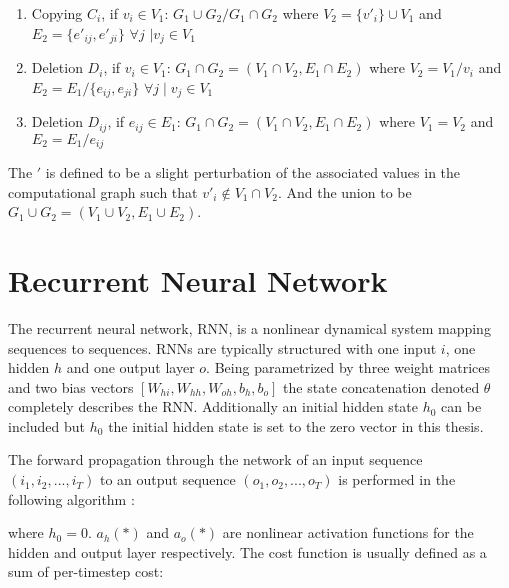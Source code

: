 \begin{enumerate}
    \item Copying $C_i$, if $v_i \in V_1$: $G_1 \cup G_2 / G_1 \cap G_2$ where $V_2 = \{v'_i\} \cup V_1$ and $E_2 = \{e'_{ij}, e'_{ji}\}$ $\forall j$ $\mid v_j \in V_1$
    \item Deletion $D_i $, if $v_i \in V_1$: $G_1 \cap G_2 = (V_1 \cap V_2, E_1 \cap E_2)$ where $V_2 = V_1 / v_i$ and $E_2 = E_1 / \{e_{ij}, e_{ji}\} $ $ \forall j \mid v_j \in V_1 $
    \item Deletion $D_{ij}$, if $e_{ij} \in E_1$: $G_1 \cap G_2 = (V_1 \cap V_2, E_1 \cap E_2)$ where $V_1 = V_2$ and $E_2 = E_1 / e_{ij}$
\end{enumerate}

The $'$ is defined to be a slight perturbation of the associated values in the computational graph such that $v'_i \notin V_1 \cap V_2$. And the union to be $G_1 \cup G_2 = (V_1 \cup V_2, E_1 \cup E_2)$.

\section{Recurrent Neural Network}

The recurrent neural network, RNN, is a nonlinear dynamical system mapping sequences to sequences. RNNs are typically structured with one input $i$, one hidden $h$ and one output layer $o$. Being parametrized by three weight matrices and two bias vectors \([W_{hi}, W_{hh}, W_{oh}, b_h, b_o]\) the state concatenation denoted \(\theta\) completely describes the RNN. Additionally an initial hidden state $h_0$ can be included but $h_0$ the initial hidden state is set to the zero vector in this thesis.

The forward propagation through the network of an input sequence \((i_1, i_2, ... , i_T)\) to an output sequence \((o_1, o_2, ..., o_T) \) is performed in the following algorithm \cite{suts}:

\begin{algorithmic}[1]
    \EndFor
\end{algorithmic}

where $h_0 = 0$. $a_h(*)$ and $a_o(*)$ are nonlinear activation functions for the hidden and output layer respectively. The cost function is usually defined as a sum of per-timestep cost:

